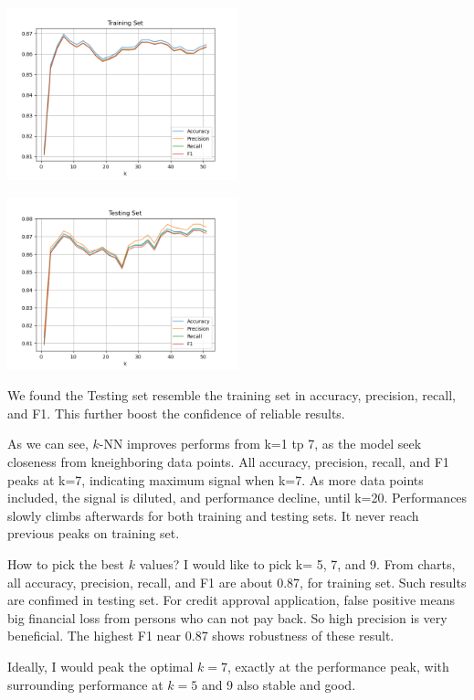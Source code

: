 \includegraphics[width=0.5\textwidth]{./figures/knn_credit_approval_adj_training_True.png}

\includegraphics[width=0.5\textwidth]{./figures/knn_credit_approval_adj_testing_True.png}


We found the Testing set resemble the training set in accuracy, precision, recall, and F1.
This further boost the confidence of reliable results.
  

As we can see, $k$-NN improves performs from k=1 tp 7, as the model seek closeness from kneighboring
data points.
All accuracy, precision, recall, and F1 peaks at k=7, indicating maximum signal when k=7.
As more data points included, the signal is diluted, and performance decline, until k=20.
Performances slowly climbs afterwards for both training and testing sets.
It never reach previous peaks on training set.


How to pick the best $k$ values? I would like to pick k= 5, 7, and 9.
From charts, all accuracy, precision, recall, and F1 are about 0.87, for training set.
Such results are confimed in testing set.
For credit approval application, false positive means big financial loss from persons who can not
pay back.
So high precision is very beneficial.
The highest F1 near 0.87 shows robustness of these result.


Ideally, I would peak the optimal $k=7$, exactly at the performance peak, with surrounding performance at $k=5$ and 9 also stable and good.

\newpage

